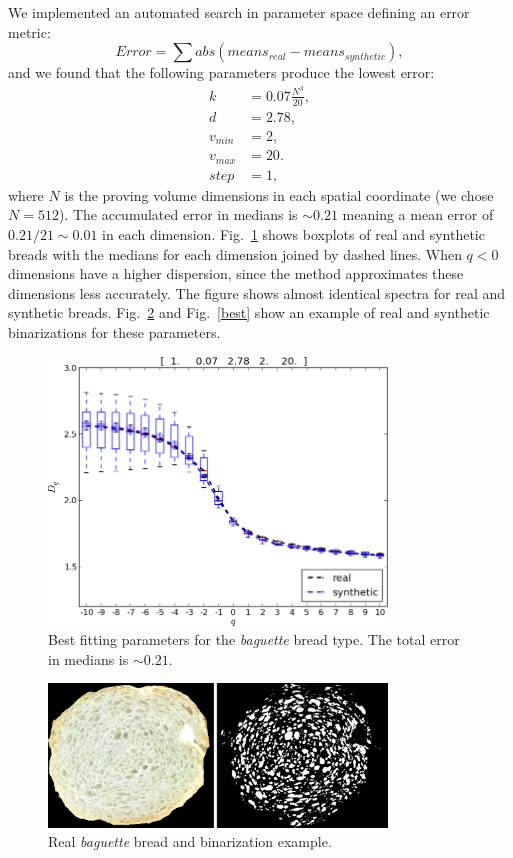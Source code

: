 \documentclass[spanish,a4paper,openright,11pt]{book}
\begin{document}
We implemented an automated search in parameter space defining an error metric: 
\begin{equation*}
Error = \displaystyle \sum abs(means_{real}-means_{synthetic}),
\end{equation*}
and we found that the following parameters produce the lowest error:
\begin{align*}
k &= 0.07 \frac{N^{3}}{20} ,\\
d &=2.78,\\
v_{min} &=2,\\
v_{max} &=20.\\
step &=1,
\end{align*}
where $N$ is the proving volume dimensions in each spatial coordinate (we chose $N = 512$). 
The accumulated error in medians is $\sim 0.21$ meaning a mean error of $0.21/21 \sim 0.01$ in each dimension.
Fig.~\ref{bestboxplot} shows boxplots of real and synthetic breads with the medians for each dimension joined by dashed lines.
When $q < 0$ dimensions have a higher dispersion, since the method approximates these dimensions less accurately.
The figure shows almost identical spectra for real and synthetic breads. Fig.~\ref{realbin} and Fig.~\ref{best} show an example of real and synthetic binarizations for these parameters.


\begin{figure}[!ht]
\includegraphics[width=9cm]{figures/bestboxplot}
\caption{Best fitting parameters for the {\em baguette} bread type. The total error in medians is $\sim 0.21$.}
\label{bestboxplot}
\end{figure}

\begin{figure}[!ht]
\begin{center}
\includegraphics[width=9cm]{figures/realbin}
\caption{ Real {\em baguette} bread and binarization example.}
\label{realbin}
\end{center}
\end{figure}
\end{document}
